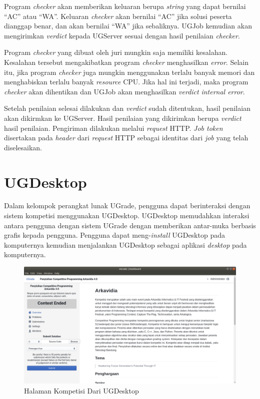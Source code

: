 \par Program \textit{checker} akan memberikan keluaran berupa \textit{string} yang dapat bernilai ``AC'' atau ``WA''. Keluaran \textit{checker} akan bernilai ``AC'' jika solusi peserta dianggap benar, dan akan bernilai ``WA'' jika sebaliknya. UGJob kemudian akan mengirimkan \textit{verdict} kepada UGServer sesuai dengan hasil penilaian \textit{checker}.

\par Program \textit{checker} yang dibuat oleh juri mungkin saja memiliki kesalahan. Kesalahan tersebut mengakibatkan program \textit{checker} menghasilkan \textit{error}. Selain itu, jika program \textit{checker} juga mungkin menggunakan terlalu banyak memori dan menghabiskan terlalu banyak \textit{resource} CPU. Jika hal ini terjadi, maka program \textit{checker} akan dihentikan dan UGJob akan menghasilkan \textit{verdict} \textit{internal error}.

\par Setelah penilaian selesai dilakukan dan \textit{verdict} sudah ditentukan, hasil penilaian akan dikirmkan ke UGServer. Hasil penilaian yang dikirimkan berupa \textit{verdict} hasil penilaian. Pengiriman dilakukan melalui \textit{request} HTTP. \textit{Job token} disertakan pada \textit{header} dari \textit{request} HTTP sebagai identitas dari \textit{job} yang telah diselesaikan.

\section{UGDesktop}

\par Dalam kelompok perangkat lunak UGrade, pengguna dapat berinteraksi dengan sistem kompetisi menggunakan UGDesktop. UGDesktop memudahkan interaksi antara pengguna dengan sistem UGrade dengan memberikan antar-muka berbasis grafis kepada pengguna. Pengguna dapat meng-\textit{install} UGDesktop pada komputernya kemudian menjalankan UGDesktop sebagai aplikasi \textit{desktop} pada komputernya.

\begin{figure}[ht!]
    \centering
    \includegraphics[width=\textwidth]{images/ugdesktop-example}
    \caption{Halaman Kompetisi Dari UGDesktop}
    \label{fig:ugdesktop-example}
\end{figure}

